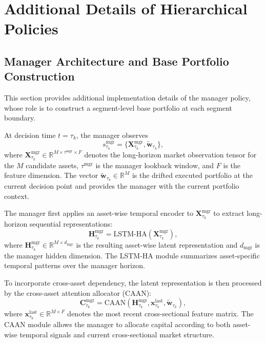 \documentclass[letterpaper]{article} %
\begin{document}
% 

\appendix

\section{Additional Details of Hierarchical Policies}
\label{app:hier_policy}

\subsection{Manager Architecture and Base Portfolio Construction}
\label{app:hier_manager}

This section provides additional implementation details of the manager policy, whose role is to construct a segment-level base portfolio at each segment boundary.

At decision time \(t=\tau_k\), the manager observes
\[
s^{\mathrm{mgr}}_{\tau_k}
=
\bigl\{\mathbf{X}^{\mathrm{mgr}}_{\tau_k},\tilde{\mathbf{w}}_{\tau_k}\bigr\},
\]
where \(\mathbf{X}^{\mathrm{mgr}}_{\tau_k}\in\mathbb{R}^{M\times \tau^{\mathrm{mgr}}\times F}\) denotes the long-horizon market observation tensor for the \(M\) candidate assets, \(\tau^{\mathrm{mgr}}\) is the manager lookback window, and \(F\) is the feature dimension. The vector \(\tilde{\mathbf{w}}_{\tau_k}\in\mathbb{R}^{M}\) is the drifted executed portfolio at the current decision point and provides the manager with the current portfolio context.

The manager first applies an asset-wise temporal encoder to \(\mathbf{X}^{\mathrm{mgr}}_{\tau_k}\) to extract long-horizon sequential representations:
\[
\mathbf{H}^{\mathrm{mgr}}_{\tau_k}
=
\mathrm{LSTM\mbox{-}HA}\!\left(\mathbf{X}^{\mathrm{mgr}}_{\tau_k}\right),
\]
where \(\mathbf{H}^{\mathrm{mgr}}_{\tau_k}\in\mathbb{R}^{M\times d_{\mathrm{mgr}}}\) is the resulting asset-wise latent representation and \(d_{\mathrm{mgr}}\) is the manager hidden dimension. The LSTM-HA module summarizes asset-specific temporal patterns over the manager horizon.

To incorporate cross-asset dependency, the latent representation is then processed by the cross-asset attention allocator (CAAN):
\[
\mathbf{C}^{\mathrm{mgr}}_{\tau_k}
=
\mathrm{CAAN}\!\left(
\mathbf{H}^{\mathrm{mgr}}_{\tau_k},
\mathbf{x}^{\mathrm{last}}_{\tau_k},
\tilde{\mathbf{w}}_{\tau_k}
\right),
\]
where \(\mathbf{x}^{\mathrm{last}}_{\tau_k}\in\mathbb{R}^{M\times F}\) denotes the most recent cross-sectional feature matrix. The CAAN module allows the manager to allocate capital according to both asset-wise temporal signals and current cross-sectional market structure.
\end{document}
